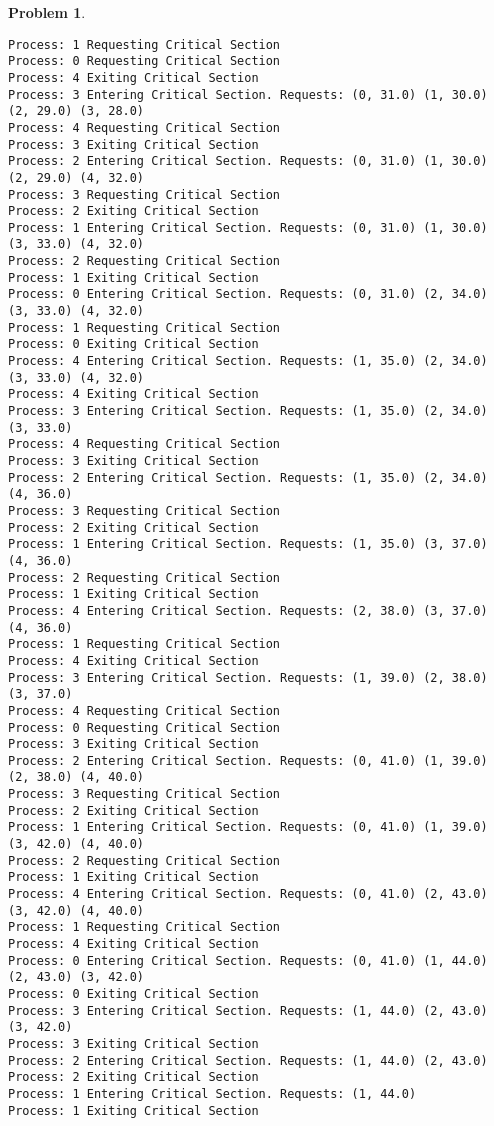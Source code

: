 \documentclass{article}
\theoremstyle{problemstyle}
\newtheorem{problem}{Problem}
\begin{document}
\begin{problem}
\begin{enumerate}[label=(\alph*)]
\begin{lstlisting}
Process: 1 Requesting Critical Section
Process: 0 Requesting Critical Section
Process: 4 Exiting Critical Section
Process: 3 Entering Critical Section. Requests: (0, 31.0) (1, 30.0) (2, 29.0) (3, 28.0)
Process: 4 Requesting Critical Section
Process: 3 Exiting Critical Section
Process: 2 Entering Critical Section. Requests: (0, 31.0) (1, 30.0) (2, 29.0) (4, 32.0)
Process: 3 Requesting Critical Section
Process: 2 Exiting Critical Section
Process: 1 Entering Critical Section. Requests: (0, 31.0) (1, 30.0) (3, 33.0) (4, 32.0)
Process: 2 Requesting Critical Section
Process: 1 Exiting Critical Section
Process: 0 Entering Critical Section. Requests: (0, 31.0) (2, 34.0) (3, 33.0) (4, 32.0)
Process: 1 Requesting Critical Section
Process: 0 Exiting Critical Section
Process: 4 Entering Critical Section. Requests: (1, 35.0) (2, 34.0) (3, 33.0) (4, 32.0)
Process: 4 Exiting Critical Section
Process: 3 Entering Critical Section. Requests: (1, 35.0) (2, 34.0) (3, 33.0)
Process: 4 Requesting Critical Section
Process: 3 Exiting Critical Section
Process: 2 Entering Critical Section. Requests: (1, 35.0) (2, 34.0) (4, 36.0)
Process: 3 Requesting Critical Section
Process: 2 Exiting Critical Section
Process: 1 Entering Critical Section. Requests: (1, 35.0) (3, 37.0) (4, 36.0)
Process: 2 Requesting Critical Section
Process: 1 Exiting Critical Section
Process: 4 Entering Critical Section. Requests: (2, 38.0) (3, 37.0) (4, 36.0)
Process: 1 Requesting Critical Section
Process: 4 Exiting Critical Section
Process: 3 Entering Critical Section. Requests: (1, 39.0) (2, 38.0) (3, 37.0)
Process: 4 Requesting Critical Section
Process: 0 Requesting Critical Section
Process: 3 Exiting Critical Section
Process: 2 Entering Critical Section. Requests: (0, 41.0) (1, 39.0) (2, 38.0) (4, 40.0)
Process: 3 Requesting Critical Section
Process: 2 Exiting Critical Section
Process: 1 Entering Critical Section. Requests: (0, 41.0) (1, 39.0) (3, 42.0) (4, 40.0)
Process: 2 Requesting Critical Section
Process: 1 Exiting Critical Section
Process: 4 Entering Critical Section. Requests: (0, 41.0) (2, 43.0) (3, 42.0) (4, 40.0)
Process: 1 Requesting Critical Section
Process: 4 Exiting Critical Section
Process: 0 Entering Critical Section. Requests: (0, 41.0) (1, 44.0) (2, 43.0) (3, 42.0)
Process: 0 Exiting Critical Section
Process: 3 Entering Critical Section. Requests: (1, 44.0) (2, 43.0) (3, 42.0)
Process: 3 Exiting Critical Section
Process: 2 Entering Critical Section. Requests: (1, 44.0) (2, 43.0)
Process: 2 Exiting Critical Section
Process: 1 Entering Critical Section. Requests: (1, 44.0)
Process: 1 Exiting Critical Section

\end{lstlisting}
\end{enumerate}
\end{problem}
\end{document}
